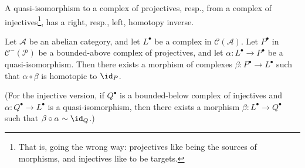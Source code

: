 A quasi-isomorphism to a complex of projectives, resp., from a complex of injectives\footnote{That is, going the wrong way: projectives like being the sources of morphisms, and injectives like to be targets.}, has a right, resp., left, homotopy inverse.
\begin{proposition}\label{quasi homo inv}
Let $\mathcal{A}$ be an abelian category, and let $L^\bullet$ be a complex in $\mathcal{C}(\mathcal{A})$. Let $P^\bullet$ in $\mathcal{C}^-(\mathcal{P})$ be a bounded-above complex of projectives, and let $\alpha:L^\bullet\to P^\bullet$ be a quasi-isomorphism. Then there exists a morphism of complexes $\beta:P^\bullet\to L^\bullet$ such that $\alpha\circ\beta$ is homotopic to $\id_P$.
\end{proposition}
(For the injective version, if $Q^\bullet$ is a bounded-below complex of injectives and $\alpha:Q^\bullet\to L^\bullet$ is a quasi-isomorphism, then there exists a morphism $\beta:L^\bullet\to Q^\bullet$ such that $\beta\circ\alpha\sim \id_Q$.)

